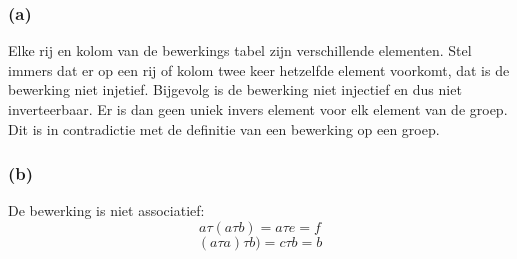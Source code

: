 \documentclass[main.tex]{subfiles}
\begin{document}
\subsubsection*{(a)}
Elke rij en kolom van de bewerkings tabel zijn verschillende elementen.
Stel immers dat er op een rij of kolom twee keer hetzelfde element voorkomt, dat is de bewerking niet injetief.
Bijgevolg is de bewerking niet injectief en dus niet inverteerbaar.
Er is dan geen uniek invers element voor elk element van de groep.
Dit is in contradictie met de definitie van een bewerking op een groep.

\subsubsection*{(b)}
De bewerking is niet associatief:
\[
a \tau (a \tau b)=a \tau e=f
\]
\[
(a \tau a) \tau b)=c \tau b=b
\]
\end{document}
